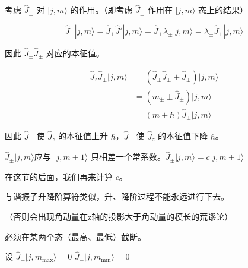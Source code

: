 \documentclass[lang=cn,10pt]{elegantbook}
\begin{document}
考虑 \(\hat{J}_\pm\) 对 \(|j, m\rangle\) 的作用。（即考虑 \(\hat{J}_\pm\) 作用在 \(|j, m\rangle\) 态上的结果）

\[
\hat{J}_\pm |j, m\rangle = \hat{J}_\pm \hat{J}' |j, m\rangle = \hat{J}_\pm \lambda_\pm |j, m\rangle = \lambda_\pm \hat{J}_\pm |j, m\rangle
\]

因此 \(\hat{J}_\pm \hat{J}_\pm\) 对应的本征值。

\begin{align*}
	\hat{J}_z \hat{J}_\pm |j, m\rangle &= \left( \hat{J}_\pm \hat{J}_\pm \pm \hat{J}_\pm \right) |j, m\rangle \\
	&= \left( m_\pm \pm \hat{J}_\pm \right) |j, m\rangle \\
	&= (m \pm \hbar) \hat{J}_\pm |j, m\rangle
\end{align*}

因此 \(\hat{J}_+\) 使 \(\hat{J}_z\) 的本征值上升 \(\hbar\)，\(\hat{J}_-\) 使 \(\hat{J}_z\) 的本征值下降 \(\hbar\)。

$\hat{J}_\pm |j, m\rangle $应与 \(|j, m\pm 1\rangle\) 只相差一个常系数。\(\hat{J}_\pm |j, m\rangle = c |j, m\pm 1\rangle\)

在这节的后面，我们再来计算 \(c\)。

与谐振子升降阶算符类似，升、降阶过程不能永远进行下去。

（否则会出现角动量在z轴的投影大于角动量的模长的荒谬论）

必须在某两个态（最高、最低）截断。

设 \(\hat{J}_+ |j, m_{\text{max}}\rangle = 0\) \(\hat{J}_- |j, m_{\text{min}}\rangle = 0\)
\end{document}
